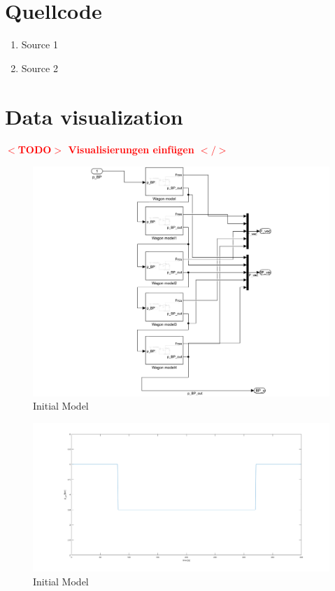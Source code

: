 \documentclass[12pt,a4paper]{book}
\newcommand{\TODO}[1]{\textbf{\textcolor{red}{$<$TODO$>$ #1 $</>$}}}
\begin{document}
\chapter{Quellcode}
\begin{enumerate}
      \item Source 1
      \item Source 2
\end{enumerate}



\chapter{Data visualization}

%
\TODO{Visualisierungen einfügen}
\begin{figure}[H]
	\centering
	\includegraphics[width=\linewidth]{./pic/initmodel_subsys}
	\caption{Initial Model}
	\label{fig:initmodel_subsys}
\end{figure}

\begin{figure}[H]
	\centering
	\includegraphics[width=\linewidth]{./pic/initmodel_input}
	\caption{Initial Model}
	\label{fig:initmodel_input}
\end{figure}
\end{document}
